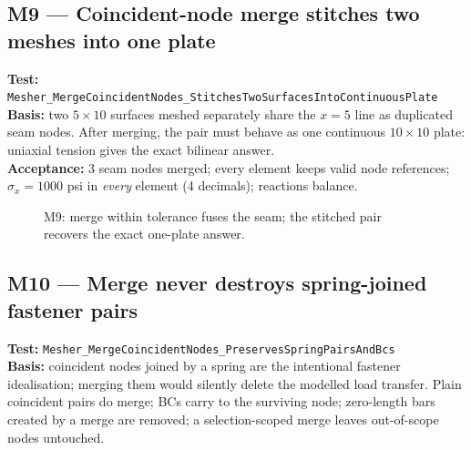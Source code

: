 \documentclass[11pt,a4paper]{article}
\newcommand{\wall}[3]{%
  \draw[thick] (#1,#2) -- (#1,#3);
  \fill[pattern=north east lines] (#1-0.18,#2) rectangle (#1,#3);
}
\begin{document}
\subsection{M9 --- Coincident-node merge stitches two meshes into one plate}
\textbf{Test:} \texttt{Mesher\_MergeCoincidentNodes\_StitchesTwoSurfacesIntoContinuousPlate}\\
\textbf{Basis:} two $5\times10$ surfaces meshed separately share the $x=5$
line as duplicated seam nodes. After merging, the pair must behave as one
continuous $10\times10$ plate: uniaxial tension gives the exact bilinear
answer.\\
\textbf{Acceptance:} 3 seam nodes merged; every element keeps valid node
references; $\sigma_x = 1000$ psi in \emph{every} element (4 decimals);
reactions balance.

\begin{figure}[H]\centering
{}
\caption{M9: merge within tolerance fuses the seam; the stitched pair recovers the exact one-plate answer.}
\end{figure}

\subsection{M10 --- Merge never destroys spring-joined fastener pairs}
\textbf{Test:} \texttt{Mesher\_MergeCoincidentNodes\_PreservesSpringPairsAndBcs}\\
\textbf{Basis:} coincident nodes joined by a spring are the intentional
fastener idealisation; merging them would silently delete the modelled load
transfer. Plain coincident pairs do merge; BCs carry to the surviving node;
zero-length bars created by a merge are removed; a selection-scoped merge
leaves out-of-scope nodes untouched.
\end{document}
